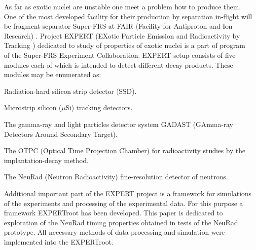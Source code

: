 \documentclass{webofc}
\begin{document}
As far as exotic nuclei are unstable one meet a problem how to produce them.
One of the most developed facility for their production by separation in-flight will be fragment separator Super-FRS at FAIR (Facility for Antiproton and Ion Research) \cite{diplom}. Project EXPERT (EXotic Particle Emission and Radioactivity by Tracking \cite{IMexpert}) dedicated to study of properties of exotic nuclei is a part of program of the Super-FRS Experiment Collaboration. EXPERT setup consists of five modules each of which is intended to detect different decay products.
These modules may be enumerated as:
\begin{inparaenum}[(i)]
	\item Radiation-hard silicon strip detector (SSD).
	\item Microstrip silicon ($\mu$Si) tracking detectors.
	\item The gamma-ray and light particles detector system GADAST (GAmma-ray Detectors Around Secondary Target).
	\item The OTPC (Optical Time Projection Chamber) for radioactivity studies by the implantation-decay method.
	\item The NeuRad (Neutron Radioactivity) fine-resolution detector of neutrons.
\end{inparaenum}

Additional important part of the EXPERT project is a framework for simulations of the experiments and processing of the experimental data. For this purpose a framework EXPERTroot \cite{er} has been developed.
This paper is dedicated to exploration of the NeuRad timing properties obtained in tests of the NeuRad prototype. All necessary methods of data processing and simulation were implemented into the EXPERTroot.
\end{document}
